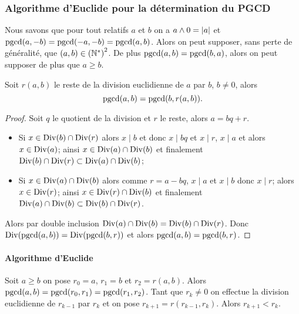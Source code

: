 \subsubsection{Algorithme d'Euclide pour la détermination du PGCD}


Nous savons que pour tout relatifs \(a\) et \(b\) on a \(a \wedge 0 = \left\lvert a\right\rvert\) 
et \(\operatorname{pgcd}(a,-b) = \operatorname{pgcd}(-a,-b) = \operatorname{pgcd}(a,b)\). Alors on peut supposer, sans 
perte de généralité, que \((a,b) \in \left(\mathbb{N}^{*}\right)^{2}\). De plus 
\(\operatorname{pgcd}(a,b) =\operatorname{pgcd}(b,a)\), alors on peut supposer de plus que \(a \geqslant 
b\).

\begin{lemme}
  Soit \(r(a,b)\) le reste de la division euclidienne de \(a\) par \(b\), \(b 
  \neq 0\), alors
  \begin{equation}
    \operatorname{pgcd}(a,b) = \operatorname{pgcd}(b,r(a,b)).
  \end{equation}
\end{lemme}
\begin{proof}
  Soit \(q\) le quotient de la division et \(r\) le reste, alors \(a=bq+r\).
  \begin{itemize}
    \item Si \(x \in \operatorname{Div}(b) \cap \operatorname{Div}(r)\) alors \(x \mid b\) et donc \(x \mid 
      bq\) et \(x \mid r\), \(x \mid a\) et alors \(x \in \operatorname{Div}(a)\); ainsi \(x 
      \in \operatorname{Div}(a) \cap \operatorname{Div}(b)\) et finalement \(\operatorname{Div}(b) \cap \operatorname{Div}(r) \subset 
      \operatorname{Div}(a) \cap \operatorname{Div}(b)\);
    \item Si \(x \in \operatorname{Div}(a) \cap \operatorname{Div}(b)\) alors comme \(r=a-bq\), \(x \mid a\) 
      et \(x \mid b\) donc \(x \mid r\); alors \(x \in \operatorname{Div}(r)\); ainsi \(x \in 
      \operatorname{Div}(r) \cap \operatorname{Div}(b)\) et finalement \(\operatorname{Div}(a) \cap \operatorname{Div}(b) \subset 
      \operatorname{Div}(b) \cap \operatorname{Div}(r)\).
  \end{itemize}
  Alors par double inclusion \(\operatorname{Div}(a) \cap \operatorname{Div}(b)= \operatorname{Div}(b) \cap \operatorname{Div}(r)\). 
  Donc \(\operatorname{Div}(\operatorname{pgcd}(a,b)) = \operatorname{Div}(\operatorname{pgcd}(b,r))\) et alors \(\operatorname{pgcd}(a,b) = 
  \operatorname{pgcd}(b,r)\).
\end{proof}

\paragraph{Algorithme d'Euclide}

Soit \(a \geqslant b\) on pose \(r_0=a\), \(r_1=b\) et \(r_2=r(a,b)\). Alors 
\(\operatorname{pgcd}(a,b) = \operatorname{pgcd}(r_0, r_1) = \operatorname{pgcd}(r_1,r_2)\). Tant que \(r_k \neq 0\) on 
effectue la division euclidienne de \(r_{k-1}\) par \(r_k\) et on pose 
\(r_{k+1}=r(r_{k-1},r_k)\). Alors \(r_{k+1} < r_k\).


